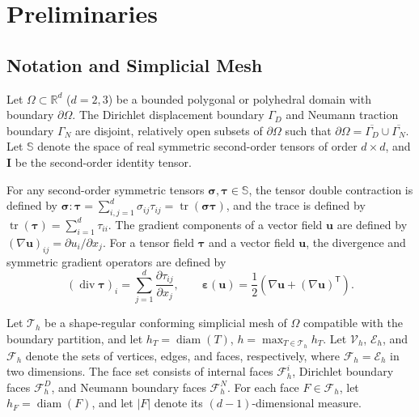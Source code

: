 \section{Preliminaries}
\label{sec:preliminaries}

\subsection{Notation and Simplicial Mesh}
\label{subsec:notation}

Let $\Omega \subset \mathbb{R}^d$ ($d=2,3$) be a bounded polygonal or polyhedral domain with boundary $\partial\Omega$. The Dirichlet displacement boundary $\Gamma_D$ and Neumann traction boundary $\Gamma_N$ are disjoint, relatively open subsets of $\partial\Omega$ such that $\partial\Omega = \overline{\Gamma_D} \cup \overline{\Gamma_N}$. Let $\mathbb{S}$ denote the space of real symmetric second-order tensors of order $d \times d$, and $\boldsymbol{I}$ be the second-order identity tensor.

For any second-order symmetric tensors $\boldsymbol{\sigma}, \boldsymbol{\tau} \in \mathbb{S}$, the tensor double contraction is defined by $\boldsymbol{\sigma} : \boldsymbol{\tau} = \sum_{i,j=1}^d \sigma_{ij}\tau_{ij} = \operatorname{tr}(\boldsymbol{\sigma}\boldsymbol{\tau})$, and the trace is defined by $\operatorname{tr}(\boldsymbol{\tau}) = \sum_{i=1}^d \tau_{ii}$. The gradient components of a vector field $\boldsymbol{u}$ are defined by $(\nabla\boldsymbol{u})_{ij} = \partial u_i / \partial x_j$. For a tensor field $\boldsymbol{\tau}$ and a vector field $\boldsymbol{u}$, the divergence and symmetric gradient operators are defined by
\begin{equation*}
(\operatorname{div}\boldsymbol{\tau})_i = \sum_{j=1}^d \frac{\partial \tau_{ij}}{\partial x_j}, \qquad 
\boldsymbol{\varepsilon}(\boldsymbol{u}) = \frac{1}{2}\left(\nabla\boldsymbol{u} + (\nabla\boldsymbol{u})^{\mathsf T}\right).
\end{equation*}

Let $\mathcal{T}_h$ be a shape-regular conforming simplicial mesh of $\Omega$ compatible with the boundary partition, and let $h_T = \operatorname{diam}(T)$, $h = \max_{T\in\mathcal{T}_h} h_T$. Let $\mathcal{V}_h$, $\mathcal{E}_h$, and $\mathcal{F}_h$ denote the sets of vertices, edges, and faces, respectively, where $\mathcal{F}_h = \mathcal{E}_h$ in two dimensions. The face set consists of internal faces $\mathcal{F}_h^i$, Dirichlet boundary faces $\mathcal{F}_h^D$, and Neumann boundary faces $\mathcal{F}_h^N$. For each face $F \in \mathcal{F}_h$, let $h_F = \operatorname{diam}(F)$, and let $|F|$ denote its $(d-1)$-dimensional measure.


